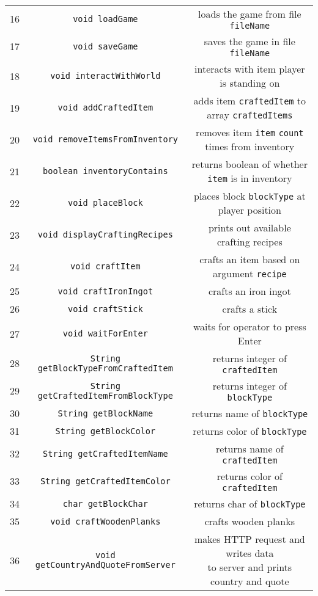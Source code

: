 \begin{table}[ht]
\begin{tabular}{ccc}
    16& \texttt{void loadGame} & loads the game from file \texttt{fileName}\\
    17& \texttt{void saveGame} & saves the game in file \texttt{fileName}\\
    18& \texttt{void interactWithWorld} & interacts with item player is standing on\\
    19& \texttt{void addCraftedItem} & adds item \texttt{craftedItem} to array \texttt{craftedItems} \\
    20& \texttt{void removeItemsFromInventory} & removes item \texttt{item} \texttt{count} times from inventory\\
    21& \texttt{boolean inventoryContains} & returns boolean of whether \texttt{item} is in inventory\\
    22& \texttt{void placeBlock} & places block \texttt{blockType} at player position\\
    23& \texttt{void displayCraftingRecipes} & prints out available crafting recipes\\
    24& \texttt{void craftItem} & crafts an item based on argument \texttt{recipe}\\
    25& \texttt{void craftIronIngot} & crafts an iron ingot\\
    26& \texttt{void craftStick} & crafts a stick\\
    27& \texttt{void waitForEnter} & waits for operator to press Enter\\
    28& \texttt{String getBlockTypeFromCraftedItem} & returns integer of \texttt{craftedItem}\\
    29& \texttt{String getCraftedItemFromBlockType} & returns integer of \texttt{blockType}\\
    30& \texttt{String getBlockName} & returns name of \texttt{blockType}\\
    31& \texttt{String getBlockColor} & returns color of \texttt{blockType}\\
    32& \texttt{String getCraftedItemName} & returns name of \texttt{craftedItem}\\
    33& \texttt{String getCraftedItemColor} & returns color of \texttt{craftedItem}\\
    34& \texttt{char getBlockChar} & returns char of \texttt{blockType}\\
    35& \texttt{void craftWoodenPlanks} & crafts wooden planks\\
    36& \texttt{void getCountryAndQuoteFromServer} & \makecell{makes HTTP request and writes data \\ to server and prints country and quote}\\
    \bottomrule
    \end{tabular}
    \label{table: style 2}
\end{table}